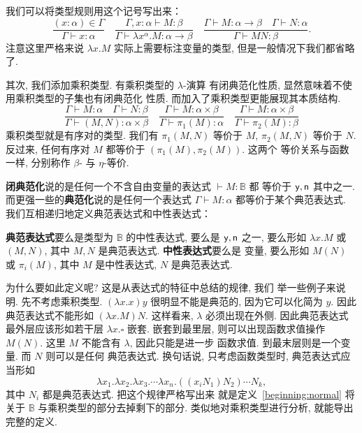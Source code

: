 我们可以将类型规则用这个记号写出来：
\[\frac{(x{:}\alpha) \in \Gamma}{\Gamma \vdash x : \alpha}
\quad\frac{\Gamma, x{:}\alpha \vdash M : \beta}{\Gamma \vdash \lambda x^\alpha. M : \alpha \to \beta}
\quad\frac{\Gamma \vdash M : \alpha \to \beta
\quad \Gamma \vdash N : \alpha}{\Gamma \vdash MN : \beta}.\]
注意这里严格来说 \(\lambda x. M\) 实际上需要标注变量的类型,
但是一般情况下我们都省略了.

其次, 我们添加乘积类型. 有乘积类型的 \(\lambda\)-演算
有闭典范化性质, 显然意味着不使用乘积类型的子集也有闭典范化
性质. 而加入了乘积类型更能展现其本质结构.
\[
\frac{\Gamma \vdash M : \alpha \quad \Gamma \vdash N : \beta}{\Gamma \vdash (M, N) : \alpha \times \beta}
\quad\frac{\Gamma \vdash M : \alpha\times\beta}{\Gamma\vdash\pi_1(M) : \alpha}
\quad\frac{\Gamma \vdash M : \alpha\times\beta}{\Gamma\vdash\pi_2(M) : \beta}
\]
乘积类型就是有序对的类型. 我们有 \(\pi_1(M, N)\) 等价于
\(M\), \(\pi_2(M, N)\) 等价于 \(N\). 反过来, 任何有序对
\(M\) 都等价于 \((\pi_1(M), \pi_2(M))\). 这两个
等价关系与函数一样, 分别称作 \(\beta\)- 与 \(\eta\)-等价.

\textbf{闭典范化}说的是任何一个不含自由变量的表达式
\(\vdash M : \mathbb B\) 都
等价于 \(\textnormal{\textsf{y}}, \textnormal{\textsf{n}}\) 其中之一.
而更强一些的\textbf{典范化}说的是任何一个表达式
\(\Gamma \vdash M : \alpha\) 都等价于某个典范表达式.
我们互相递归地定义典范表达式和中性表达式：
\begin{definition}\label{beginning:normal}
\textbf{典范表达式}要么是类型为 \(\mathbb B\) 的中性表达式,
要么是 \(\textnormal{\textsf{y}},\textnormal{\textsf{n}}\) 之一,
要么形如 \(\lambda x. M\) 或 \((M, N)\),
其中 \(M, N\) 是典范表达式. \textbf{中性表达式}要么是
变量, 要么形如 \(M(N)\) 或 \(\pi_i(M)\),
其中 \(M\) 是中性表达式, \(N\) 是典范表达式.
\end{definition}
为什么要如此定义呢? 这是从表达式的特征中总结的规律, 我们
举一些例子来说明. 先不考虑乘积类型.
\((\lambda x. x) y\) 很明显不能是典范的,
因为它可以化简为 \(y\). 因此典范表达式不能形如
\((\lambda x. M)N\). 这样看来, \(\lambda\)
必须出现在外侧. 因此典范表达式最外层应该形如若干层
\(\lambda x. \square\) 嵌套.
嵌套到最里层, 则可以出现函数求值操作 \(M(N)\).
这里 \(M\) 不能含有 \(\lambda\), 因此只能是进一步
函数求值. 到最末层则是一个变量. 而 \(N\) 则可以是任何
典范表达式. 换句话说, 只考虑函数类型时, 典范表达式应当形如
\[\lambda x_1. \lambda x_2. \lambda x_3. \cdots
\lambda x_n. ((x_iN_1)N_2) \cdots N_k,\]
其中 \(N_i\) 都是典范表达式. 把这个规律严格写出来
就是定义~\ref{beginning:normal} 将关于 \(\mathbb B\)
与乘积类型的部分去掉剩下的部分.
类似地对乘积类型进行分析, 就能导出完整的定义.

